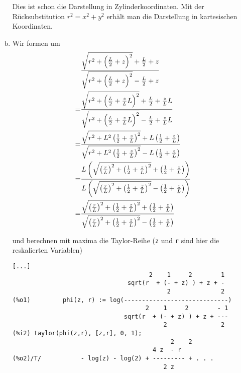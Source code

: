 \documentclass[a4paper,german,12pt,smallheadings]{scrartcl}
\begin{document}
\begin{enumerate}[a)]
    Dies ist schon die Darstellung in Zylinderkoordinaten. Mit der
    Rücksubstitution $r^2 = x^2 + y^2$ erhält man die Darstellung in
    kartesischen Koordinaten.
  \item
    Wir formen um
    \begin{align}
      &\frac{
        \sqrt{r^2 + \del{\frac{L}{2} + z}^2} + \frac{L}{2} + z
      }{
        \sqrt{r^2 + \del{\frac{L}{2} + z}^2} - \frac{L}{2} + z
      } \\
      =
      &\frac{
        \sqrt{r^2 + \del{\frac{L}{2} + \frac{z}{L} L}^2} + \frac{L}{2}  + \frac{z}{L} L
      }{
        \sqrt{r^2 + \del{\frac{L}{2} + \frac{z}{L} L}^2} - \frac{L}{2} + \frac{z}{L} L
      } \\
      =
      &\frac{
        \sqrt{r^2 + L^2 \del{\frac{1}{2} + \frac{z}{L}}^2} + L \del{\frac{1}{2}  + \frac{z}{L}}
      }{
        \sqrt{r^2 + L^2 \del{\frac{1}{2} + \frac{z}{L}}^2} - L \del{\frac{1}{2} + \frac{z}{L}}
      } \\
      =
      &\frac{
        L \del{\sqrt{\del{\frac{r}{L}}^2 + \del{\frac{1}{2} + \frac{z}{L}}^2} + \del{\frac{1}{2} + \frac{z}{L}}}
      }{
        L \del{\sqrt{\del{\frac{r}{L}}^2 + \del{\frac{1}{2} + \frac{z}{L}}^2} - \del{\frac{1}{2} + \frac{z}{L}}}
      } \\
      =
      &\frac{
        \sqrt{\del{\frac{r}{L}}^2 + \del{\frac{1}{2} + \frac{z}{L}}^2} + \del{\frac{1}{2} + \frac{z}{L}}
      }{
        \sqrt{\del{\frac{r}{L}}^2 + \del{\frac{1}{2} + \frac{z}{L}}^2} - \del{\frac{1}{2} + \frac{z}{L}}
      } \\
    \end{align}

    und berechnen mit maxima die Taylor-Reihe (\texttt{z} und \texttt{r} sind hier
    die reskalierten Variablen)
\begin{verbatim}
[...]
                                      2    1     2        1
                                sqrt(r  + (- + z) ) + z + -
                                           2              2
(%o1)         phi(z, r) := log(-----------------------------)
                                     2    1     2        - 1
                               sqrt(r  + (- + z) ) + z + ---
                                          2               2
(%i2) taylor(phi(z,r), [z,r], 0, 1);
                                            2    2
                                       4 z  - r
(%o2)/T/           - log(z) - log(2) + --------- + . . .
                                          2 z
\end{verbatim}


\end{enumerate}
\end{document}
